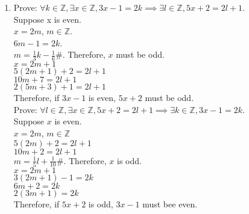 \documentclass[12pt]{article}
\begin{document}
\begin{enumerate}
        \item Prove: \(\forall k\in \mathbb{Z}, \exists x \in \mathbb{Z}, 3x-1=2k \implies \exists l \in \mathbb{Z}, 5x+2 = 2l+1\).\\
        Suppose x is even.\\
        \(x= 2m\), \(m\in\mathbb{Z}\).\\
        \(6m-1 = 2k\).\\
        \(m = \frac{1}{3}k - \frac{1}{6}\#\).
        Therefore, \(x\) must be odd.\\
        \(x = 2m+1\)\\
        \(5(2m+1) + 2 = 2l+1\)\\
        \(10m + 7 = 2l+1\)\\
        \(2(5m + 3) + 1 = 2l+1\)\\
        Therefore, if \(3x-1\) is even, \(5x + 2\) must be odd.\\
        Prove: \(\forall l \in \mathbb{Z}, \exists x \in \mathbb{Z}, 5x + 2 = 2l + 1 \implies \exists k\in \mathbb{Z}, 3x-1=2k\).\\
        Suppose \(x\) is even.\\
        \(x = 2m\), \(m \in \mathbb{Z}\)\\
        \(5(2m)+2=2l+1\)\\
        \(10m + 2 = 2l + 1\)\\
        \(m = \frac{1}{5}l + \frac{1}{10}\#\). Therefore, \(x\) is odd.\\
        \(x = 2m + 1\)\\
        \(3(2m+1) -1 = 2k\)\\
        \(6m + 2 = 2k\)\\
        \(2(3m+1)= 2k\)\\
        Therefore, if \(5x+2\) is odd, \(3x-1\) must bee even.
    \end{enumerate}
\end{document}
